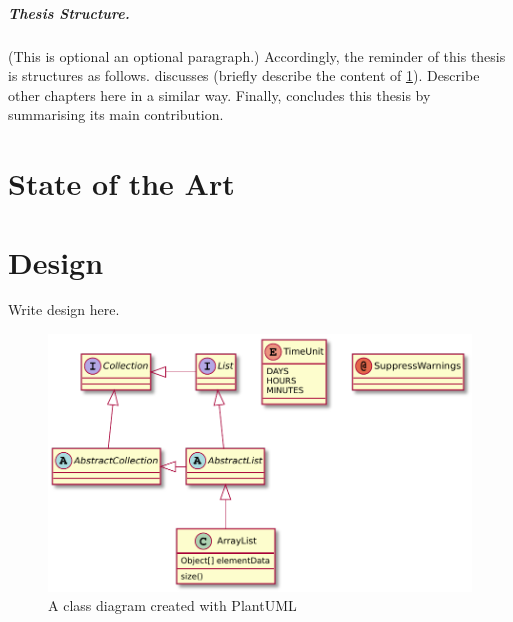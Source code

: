 \documentclass[12pt,a4paper,openright,twoside]{book}
\begin{document}
%
\paragraph{Thesis Structure.} %
%

(This is optional an optional paragraph.)
%
Accordingly, the reminder of this thesis is structures as follows.
%
 discusses (briefly describe the content of \cref{chap:background}).
%
Describe other chapters here in a similar way.
%
Finally,  concludes this thesis by summarising its main contribution.

\chapter{State of the Art} %
\label{chap:background}


%

\chapter{Design} %
\label{chap:design}

Write design here.

\begin{figure}
	\centering
	\includegraphics[width=0.5\linewidth]{figures/classes.pdf}
	\caption{A class diagram created with PlantUML}
	\label{fig:classes}
\end{figure}
\end{document}
